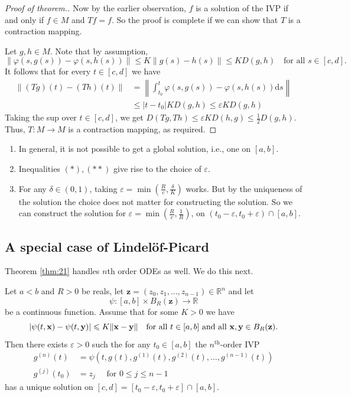 \documentclass[a4paper,11pt]{article}
\renewcommand{\epsilon}{\varepsilon}
\begin{document}
\begin{proof}[Proof of theorem.]
    Now by the earlier observation, $f$ is a solution of the IVP if and only if $f \in M$ and $T f=f$. So the proof is complete if we can show that $T$ is a contraction mapping.

    Let $g, h \in M$. Note that by assumption,
    \[
    \|\varphi(s, g(s))-\varphi(s, h(s))\| \leqslant K\|g(s)-h(s)\| \leqslant K D(g, h) \quad \text {for all } s \in[c, d].
    \]
    It follows that for every $t \in[c, d]$ we have
    \begin{align*}
        \|(T g)(t)-(T h)(t)\| &=\left\|\int_{t_0}^t \varphi(s, g(s))-\varphi(s, h(s)) \mathrm{d} s\right\| \\
    & \leqslant\left|t-t_0\right| K D(g, h) \leqslant \varepsilon K D(g, h) \tag{$**$}
    \end{align*}
    Taking the sup over $t \in[c, d]$, we get $D(T g, T h) \leqslant \varepsilon K D(h, g) \leqslant \frac{1}{2} D(g, h)$. Thus, $T: M \rightarrow M$ is a contraction mapping, as required.
\end{proof}
\begin{remark}
    \begin{enumerate}
        \item In general, it is not possible to get a global solution, i.e., one on $[a, b]$.
        \item Inequalities $ (*),(* *) $ give rise to the choice of $ \epsilon $. 
        \item For any $\delta \in(0,1)$, taking $\varepsilon=\min \left(\frac{R}{c}, \frac{\delta}{K}\right)$ works. But by the uniqueness of the solution the choice does not matter for constructing the solution. So we can construct the solution for $\varepsilon=\min \left(\frac{R}{c}, \frac{1}{R}\right)$, on $\left(t_0-\varepsilon, t_0+\varepsilon\right) \cap[a, b]$.
    \end{enumerate}
\end{remark}

\subsection{A special case of Lindel\"of-Picard}
Theorem \ref{thm:21} handles $ n $th order ODEs as well. We do this next.

\begin{example}
    Let $a<b$ and $R>0$ be reals, let $\mathbf z=\left(z_0, z_1, \ldots, z_{n-1}\right) \in \mathbb{R}^n$ and let
\[
\psi:[a, b] \times B_R(\mathbf z) \rightarrow \mathbb{R}
\]
be a continuous function. Assume that for some $K>0$ we have
\[
|\psi(t, {\bf x})-\psi(t, {\bf y})| \leqslant K\|{\bf x}-{\bf y}\| \quad \text {for all } t \in[a, b] \text { and all } {\bf x}, {\bf y} \in B_R({\bf z}) .
\]
Then there exists $\varepsilon>0$ such the for any $t_0 \in[a, b]$ the $n^{\text {th}}$-order IVP
\[
\begin{aligned}
g^{(n)}(t) &=\psi\left(t, g(t), g^{(1)}(t), g^{(2)}(t), \ldots, g^{(n-1)}(t)\right) \\
g^{(j)}\left(t_0\right) &=z_j \quad \text { for } 0 \leqslant j \leqslant n-1
\end{aligned}
\]
has a unique solution on $[c, d]=\left[t_0-\varepsilon, t_0+\varepsilon\right] \cap[a, b]$.
\end{example}
\end{document}
